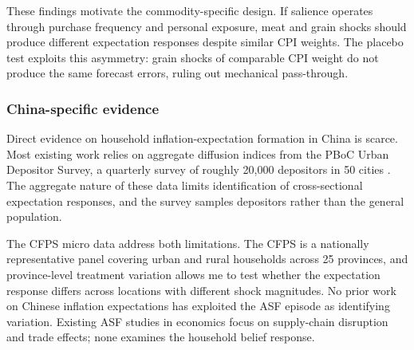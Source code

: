 These findings motivate the commodity-specific design.
If salience operates through purchase frequency and personal
exposure, meat and grain shocks should produce different
expectation responses despite similar CPI weights.
The placebo test exploits this asymmetry: grain shocks of
comparable CPI weight do not produce the same forecast errors,
ruling out mechanical pass-through.

\subsubsection{China-specific evidence}

Direct evidence on household inflation-expectation formation in
China is scarce.
Most existing work relies on aggregate diffusion indices from
the PBoC Urban Depositor Survey, a quarterly survey of roughly
20,000 depositors in 50 cities \citep[see, e.g.,][]{Chen2022}.
The aggregate nature of these data limits identification of
cross-sectional expectation responses, and the survey samples
depositors rather than the general population.

The CFPS micro data address both limitations.
The CFPS is a nationally representative panel covering urban
and rural households across 25 provinces, and province-level
treatment variation allows me to test whether the expectation
response differs across locations with different shock
magnitudes.
No prior work on Chinese inflation expectations has exploited
the ASF episode as identifying variation.
Existing ASF studies in economics focus on supply-chain
disruption and trade effects; none examines the household
belief response.


